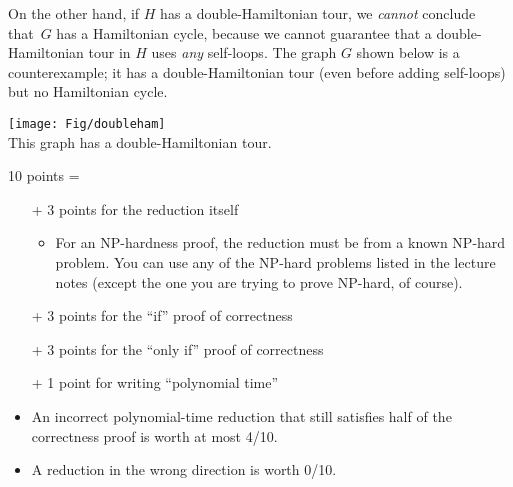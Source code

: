 \documentclass[11pt]{article}
\begin{document}
\begin{enumerate}
\begin{nonsolution}
On the other hand, if $H$ has a double-Hamiltonian tour, we \emph{cannot} conclude that~$G$ has a Hamiltonian cycle, because we cannot guarantee that a double-Hamiltonian tour in $H$ uses \emph{any} self-loops.  The graph $G$ shown below is a counterexample; it has a double-Hamiltonian tour (even before adding self-loops) but no Hamiltonian cycle.

\begin{inline}
\texttt{[image: Fig/doubleham]}\\
This graph has a double-Hamiltonian tour.
\end{inline}

\end{nonsolution}

\begin{rubric}
10 points =
\begin{itemize}\cramped
\item[+] 3 points for the reduction itself
\begin{itemize}\cramped
	\item For an {NP}-hardness proof, the reduction must be from a known {NP}-hard problem.  You can use any of the NP-hard problems listed in the lecture notes (except the one you are trying to prove NP-hard, of course).
\end{itemize}
\item[+] 3 points for the “if” proof of correctness
\item[+] 3 points for the “only if” proof of correctness
\item[+] 1 point for writing “polynomial time”
\medskip
\item An incorrect polynomial-time reduction that still satisfies half of the correctness proof is worth at most 4/10.
\item A reduction in the wrong direction is worth 0/10.
\end{itemize}
\end{rubric}

\end{enumerate}
\end{document}
